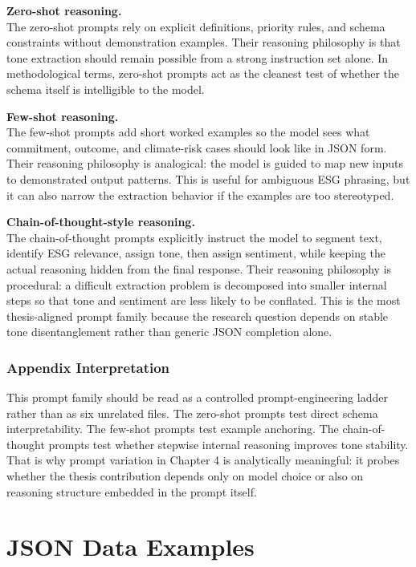 \documentclass[12pt,a4paper]{report}
\begin{document}
\textbf{Zero-shot reasoning.}\\
The zero-shot prompts rely on explicit definitions, priority rules, and schema constraints without demonstration examples. Their reasoning philosophy is that tone extraction should remain possible from a strong instruction set alone. In methodological terms, zero-shot prompts act as the cleanest test of whether the schema itself is intelligible to the model.

\textbf{Few-shot reasoning.}\\
The few-shot prompts add short worked examples so the model sees what commitment, outcome, and climate-risk cases should look like in JSON form. Their reasoning philosophy is analogical: the model is guided to map new inputs to demonstrated output patterns. This is useful for ambiguous ESG phrasing, but it can also narrow the extraction behavior if the examples are too stereotyped.

\textbf{Chain-of-thought-style reasoning.}\\
The chain-of-thought prompts explicitly instruct the model to segment text, identify ESG relevance, assign tone, then assign sentiment, while keeping the actual reasoning hidden from the final response. Their reasoning philosophy is procedural: a difficult extraction problem is decomposed into smaller internal steps so that tone and sentiment are less likely to be conflated. This is the most thesis-aligned prompt family because the research question depends on stable tone disentanglement rather than generic JSON completion alone.

\subsubsection{Appendix Interpretation}\label{appendix-interpretation}

This prompt family should be read as a controlled prompt-engineering ladder rather than as six unrelated files. The zero-shot prompts test direct schema interpretability. The few-shot prompts test example anchoring. The chain-of-thought prompts test whether stepwise internal reasoning improves tone stability. That is why prompt variation in Chapter 4 is analytically meaningful: it probes whether the thesis contribution depends only on model choice or also on reasoning structure embedded in the prompt itself.

\section{JSON Data Examples}\label{json-data-examples}
\end{document}
